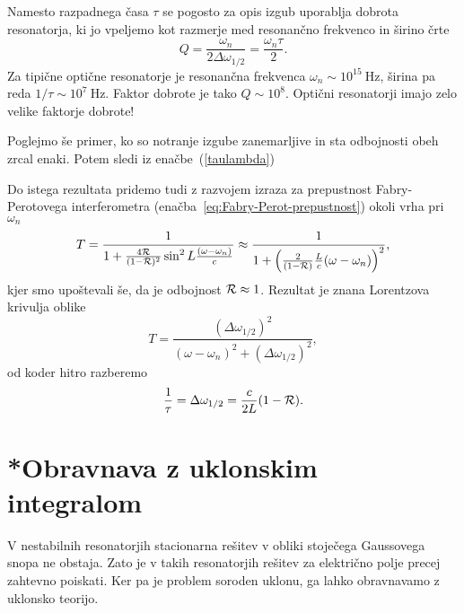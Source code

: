 \begin{remark}
Namesto razpadnega časa $\tau$ se pogosto za opis izgub uporablja
dobrota resonatorja, ki jo vpeljemo kot
razmerje med resonančno frekvenco in širino črte 
\begin{equation}
Q=\frac{\omega_{n}}{2\Delta\omega_{1/2}} = \frac{\omega_{n}\tau}{2}.
\end{equation}
Za tipične optične resonatorje je resonančna 
frekvenca $\omega_n \sim 10^{15}~\si{\hertz}$, širina pa reda 
 $1/\tau \sim 10^{7}~\si{\hertz}$. Faktor dobrote je tako $Q \sim 10^{8}$. Optični 
 resonatorji imajo zelo velike faktorje dobrote!
\end{remark}

Poglejmo še primer, ko so notranje izgube zanemarljive in sta odbojnosti obeh zrcal enaki.
Potem sledi iz enačbe~(\ref{taulambda})

Do istega rezultata pridemo tudi z razvojem izraza za prepustnost Fabry-Perotovega 
interferometra (enačba~\ref{eq:Fabry-Perot-prepustnost})
okoli vrha pri $\omega_{n}$
\begin{equation}
T=\frac{1}{1+\frac{4{\cal R}}{(1-{\cal R})^{2}}\sin^{2}L\frac{(\omega-\omega_{n})}{c}}\approx 
\frac{1}{1+\left(\frac{2}{(1-{\cal R})}\frac{L}{c}(\omega-\omega_{n})\right)^{2}},
\label{3.27}
\end{equation}
 kjer smo upoštevali še, da je odbojnost ${\cal R} \approx 1$. Rezultat je znana Lorentzova
 krivulja oblike
 \begin{equation}
 T = \frac{(\Delta\omega_{1/2})^2}{(\omega - \omega_n)^2+(\Delta\omega_{1/2})^2},
 \end{equation}
od koder hitro razberemo 
\begin{equation}
\frac{1}{\tau}=\Delta\omega_{1/2} = \frac{c}{2L}(1-{\cal R}).
\end{equation}

\section{*Obravnava z uklonskim integralom}
\label{Resonator_uklon}

V nestabilnih resonatorjih stacionarna rešitev v obliki stoječega
Gaussovega snopa ne obstaja. Zato je v takih resonatorjih rešitev za električno polje precej
zahtevno poiskati. Ker pa je problem soroden uklonu, ga lahko obravnavamo z 
uklonsko teorijo.

